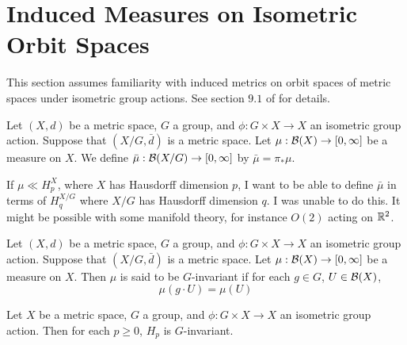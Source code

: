\documentclass{book}
\begin{document}
	
	
	
	
	
	
	
	
	
	
	
	
	
		
	\newpage
	\section{Induced Measures on Isometric Orbit Spaces}
	
	\begin{note}
	This section assumes familiarity with induced metrics on orbit spaces of metric spaces under isometric group actions. See section $9.1$ of \cite{analysis} for details. 
	\end{note}
	
	\begin{note}
	
	\end{note}
	
	\begin{defn}
	Let $(X, d)$ be a metric space, $G$ a group, and $\phi: G \times X \rightarrow X$ an isometric group action. Suppose that $(X/G, \bar{d})$ is a metric space. Let $\mu: \mathcal{B}(X) \rightarrow [0, \infty]$ be a measure on $X$. We define $\bar{\mu}: \mathcal{B}(X/G) \rightarrow [0, \infty]$ by $\bar{\mu} = \pi_* \mu$. 
	\end{defn}
	
	\begin{note}
	If $\mu \ll H_p^X$, where $X$ has Hausdorff dimension $p$, I want to be able to define $\bar{\mu}$ in terms of $H_q^{X/G}$ where $X/G$ has Hausdorff dimension $q$. I was unable to do this. It might be possible with some manifold theory, for instance $O(2)$ acting on $\mathbb{R}^2$.
	\end{note}
	
	\begin{defn}
	Let $(X, d)$ be a metric space, $G$ a group, and $\phi: G \times X \rightarrow X$ an isometric group action. Suppose that $(X/G, \bar{d})$ is a metric space. Let $\mu: \mathcal{B}(X) \rightarrow [0, \infty]$ be a measure on $X$. Then $\mu$ is said to be $G$-invariant if for each $g \in G$, $U \in \mathcal{B}(X)$, 
	\begin{equation*}
	\mu(g \cdot U) = \mu(U)
	\end{equation*}
	\end{defn}
	
	\begin{ex}
	Let $X$ be a metric space, $G$ a group, and $\phi: G \times X \rightarrow X$ an isometric group action. Then for each $p \geq 0$, $H_p$ is $G$-invariant. 
	\end{ex}	
	
\end{document}
